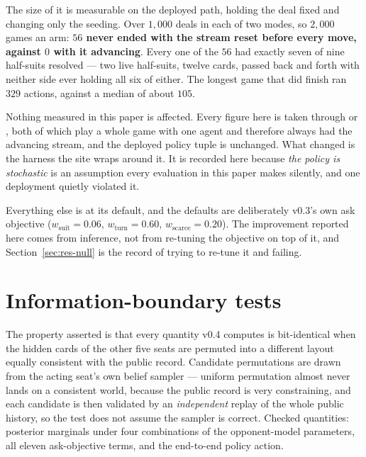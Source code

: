 \documentclass[11pt,letterpaper]{article}
\begin{document}
The size of it is measurable on the deployed path, holding the deal fixed and
changing only the seeding. Over $1{,}000$ deals in each of two modes, so
$2{,}000$ games an arm: \textbf{$56$ never ended with the stream reset before
every move, against $0$ with it advancing}. Every one of the $56$ had exactly
seven of nine half-suits resolved --- two live half-suits, twelve cards, passed
back and forth with neither side ever holding all six of either. The longest
game that did finish ran $329$ actions, against a median of about $105$.

Nothing measured in this paper is affected. Every figure here is taken through
 or , both of which play a
whole game with one agent and therefore always had the advancing stream, and the
deployed policy tuple is unchanged. What changed is the harness the site wraps
around it. It is recorded here because \emph{the policy is stochastic} is an
assumption every evaluation in this paper makes silently, and one deployment
quietly violated it.

Everything else is at its default, and the defaults are deliberately v0.3's own
ask objective ($w_{\mathrm{suit}} = 0.06$, $w_{\mathrm{turn}} = 0.60$,
$w_{\mathrm{scarce}} = 0.20$). The improvement reported here comes from
inference, not from re-tuning the objective on top of it, and
Section~\ref{sec:res-null} is the record of trying to re-tune it and failing.

\section{Information-boundary tests}
\label{app:leak}

The property asserted is that every quantity v0.4 computes is bit-identical when
the hidden cards of the other five seats are permuted into a different layout
equally consistent with the public record. Candidate permutations are drawn from
the acting seat's own belief sampler --- uniform permutation almost never lands
on a consistent world, because the public record is very constraining, and
each candidate is then validated by an \emph{independent} replay of the whole
public history, so the test does not assume the sampler is correct. Checked
quantities: posterior marginals under four combinations of the opponent-model
parameters, all eleven ask-objective terms, and the end-to-end policy action.
\end{document}
